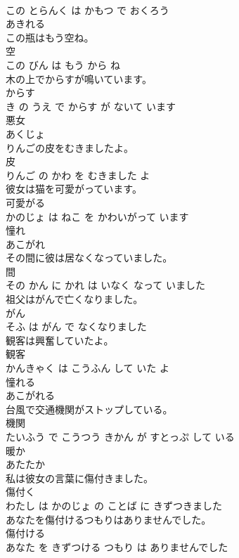 \documentclass[8pt]{extreport}
\begin{document}
\begin{CJK}{UTF8}{min}
\\	この とらんく は かもつ で おくろう			
\\	あきれる	
\\	この瓶はもう空ね。	
\\	空 
\\	この びん は もう から ね			
\\	木の上でからすが鳴いています。	
\\	からす 
\\	き の うえ で からす が ないて います			
\\	悪女	
\\	あくじょ			
\\	りんごの皮をむきましたよ。	
\\	皮 
\\	りんご の かわ を むきました よ			
\\	彼女は猫を可愛がっています。	
\\	可愛がる 
\\	かのじょ は ねこ を かわいがって います			
\\	憧れ	
\\	あこがれ			
\\	その間に彼は居なくなっていました。	
\\	間 
\\	その かん に かれ は いなく なって いました			
\\	祖父はがんで亡くなりました。	
\\	がん 
\\	そふ は がん で なくなりました			
\\	観客は興奮していたよ。	
\\	観客 
\\	かんきゃく は こうふん して いた よ			
\\	憧れる	
\\	あこがれる			
\\	台風で交通機関がストップしている。	
\\	機関 
\\	たいふう で こうつう きかん が すとっぷ して いる			
\\	暖か	
\\	あたたか			
\\	私は彼女の言葉に傷付きました。	
\\	傷付く 
\\	わたし は かのじょ の ことば に きずつきました			
\\	あなたを傷付けるつもりはありませんでした。	
\\	傷付ける 
\\	あなた を きずつける つもり は ありませんでした			

\end{CJK}
\end{document}
